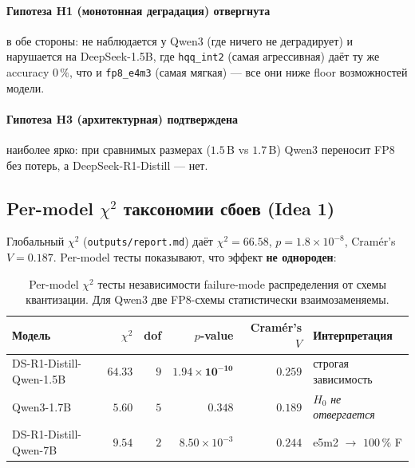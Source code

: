 \documentclass[11pt, a4paper]{article}
\newcommand{\code}[1]{\texttt{#1}}
\newcommand{\chisq}{$\chi^{2}$}
\begin{document}
\paragraph{Гипотеза H1 (монотонная деградация) отвергнута} в обе
стороны: не наблюдается у Qwen3 (где ничего не деградирует) и нарушается
на DeepSeek-1.5B, где \code{hqq\_int2} (самая агрессивная) даёт ту же
accuracy $0\,\%$, что и \code{fp8\_e4m3} (самая мягкая) — все они ниже
floor возможностей модели.

\paragraph{Гипотеза H3 (архитектурная) подтверждена} наиболее ярко: при
сравнимых размерах ($1.5\,$B vs $1.7\,$B) Qwen3 переносит FP8 без
потерь, а DeepSeek-R1-Distill — нет.

\subsection{Per-model \chisq{} таксономии сбоев (Idea 1)}

Глобальный \chisq{} (\code{outputs/report.md}) даёт $\chi^{2}=66.58$,
$p=1.8\times 10^{-8}$, Cramér's $V=0.187$. Per-model тесты показывают,
что эффект \textbf{не однороден}:

\begin{table}[H]
\centering
\small
\begin{tabular}{lrrrrl}
\toprule
\textbf{Модель} & \chisq{} & \textbf{dof} & \textbf{$p$-value} & \textbf{Cramér's $V$} & \textbf{Интерпретация} \\
\midrule
DS-R1-Distill-Qwen-1.5B & $64.33$ & $9$ & $\mathbf{1.94\times 10^{-10}}$ & $0.259$ & строгая зависимость \\
Qwen3-1.7B              & $5.60$  & $5$ & $\mathbf{0.348}$  & $0.189$ & $H_{0}$ \emph{не отвергается} \\
DS-R1-Distill-Qwen-7B   & $9.54$  & $2$ & $8.50\times 10^{-3}$ & $0.244$ & e5m2 $\to$ $100\,\%$ F \\
\bottomrule
\end{tabular}
\caption{Per-model \chisq{} тесты независимости failure-mode распределения от
схемы квантизации. Для Qwen3 две FP8-схемы статистически взаимозаменяемы.}
\label{tab:per-model-chi2}
\end{table}
\end{document}
